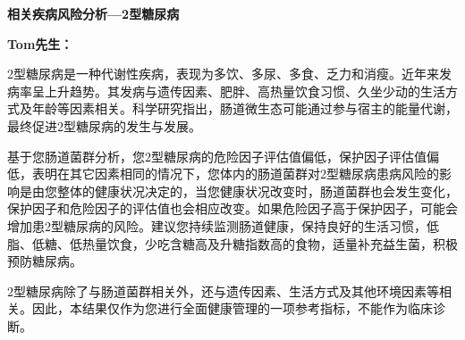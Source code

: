 

\usepackage{graphicx}
\graphicspath{{cores/}}




\setlength{\arrayrulewidth}{0.5pt}
\fontsize{9.3pt}{17pt}\selectfont
\color{gray2}

\vspace*{0mm}
\begin{center}
{\bf\sanhao 相关疾病风险分析—2型糖尿病}
\end{center}

\medskip

\noindent
{\bf\xiaosihao Tom先生：}


\bigskip
2型糖尿病是一种代谢性疾病，表现为多饮、多尿、多食、乏力和消瘦。近年来发病率呈上升趋势。其发病与遗传因素、肥胖、高热量饮食习惯、久坐少动的生活方式及年龄等因素相关。科学研究指出，肠道微生态可能通过参与宿主的能量代谢，最终促进2型糖尿病的发生与发展。

基于您肠道菌群分析，您2型糖尿病的危险因子评估值偏低，保护因子评估值偏低，表明在其它因素相同的情况下，您体内的肠道菌群对2型糖尿病患病风险的影响是由您整体的健康状况决定的，当您健康状况改变时，肠道菌群也会发生变化，保护因子和危险因子的评估值也会相应改变。如果危险因子高于保护因子，可能会增加患2型糖尿病的风险。建议您持续监测肠道健康，保持良好的生活习惯，低脂、低糖、低热量饮食，少吃含糖高及升糖指数高的食物，适量补充益生菌，积极预防糖尿病。

2型糖尿病除了与肠道菌群相关外，还与遗传因素、生活方式及其他环境因素等相关。因此，本结果仅作为您进行全面健康管理的一项参考指标，不能作为临床诊断。


